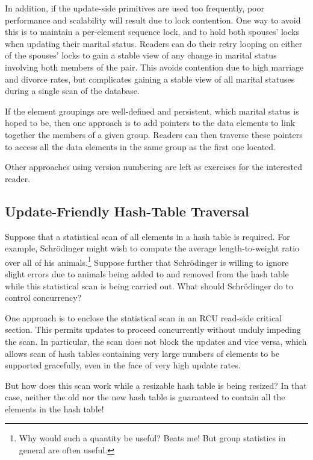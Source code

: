 In addition, if the update-side primitives are used too frequently,
poor performance and scalability will result due to lock contention.
One way to avoid this is to maintain a per-element sequence lock,
and to hold both spouses' locks when updating their marital status.
Readers can do their retry looping on either of the spouses' locks
to gain a stable view of any change in marital status involving both
members of the pair.
This avoids contention due to high marriage and divorce rates, but
complicates gaining a stable view of all marital statuses during a
single scan of the database.

If the element groupings are well-defined and persistent, which marital
status is hoped to be,
then one approach is to add pointers to the data elements to link
together the members of a given group.
Readers can then traverse these pointers to access all the data elements
in the same group as the first one located.

Other approaches using version numbering are left as exercises for the
interested reader.

\subsection{Update-Friendly Hash-Table Traversal}
\label{sec:together:Update-Friendly Hash-Table Traversal}

Suppose that a statistical scan of all elements in a hash table is
required.
For example, Schr\"odinger might wish to compute the average
length-to-weight ratio over all of his animals.\footnote{
	Why would such a quantity be useful?
	Beats me!
	But group statistics in general are often useful.}
Suppose further that Schr\"odinger is willing to ignore slight
errors due to animals being added to and removed from the hash
table while this statistical scan is being carried out.
What should Schr\"odinger do to control concurrency?

One approach is to enclose the statistical scan in an RCU read-side
critical section.
This permits updates to proceed concurrently without unduly impeding
the scan.
In particular, the scan does not block the updates and vice versa,
which allows scan of hash tables containing very large numbers of
elements to be supported gracefully, even in the face of very high
update rates.

\QuickQuiz{}
	But how does this scan work while a resizable hash table
	is being resized?
	In that case, neither the old nor the new hash table is
	guaranteed to contain all the elements in the hash table!
 \QuickQuizEnd
